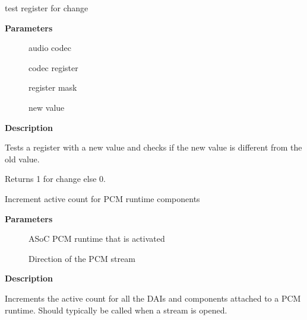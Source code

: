 \documentclass[a4paper,8pt,english]{sphinxmanual}
\begin{document}
\begin{fulllineitems}
\label{sound/kernel-api/alsa-driver-api:c.snd_soc_test_bits}
test register for change

\end{fulllineitems}


\textbf{Parameters}
\begin{description}
\item[{}] \leavevmode
audio codec

\item[{}] \leavevmode
codec register

\item[{}] \leavevmode
register mask

\item[{}] \leavevmode
new value

\end{description}

\textbf{Description}

Tests a register with a new value and checks if the new value is
different from the old value.

Returns 1 for change else 0.

\begin{fulllineitems}
\label{sound/kernel-api/alsa-driver-api:c.snd_soc_runtime_activate}
Increment active count for PCM runtime components

\end{fulllineitems}


\textbf{Parameters}
\begin{description}
\item[{}] \leavevmode
ASoC PCM runtime that is activated

\item[{}] \leavevmode
Direction of the PCM stream

\end{description}

\textbf{Description}

Increments the active count for all the DAIs and components attached to a PCM
runtime. Should typically be called when a stream is opened.
\end{document}
